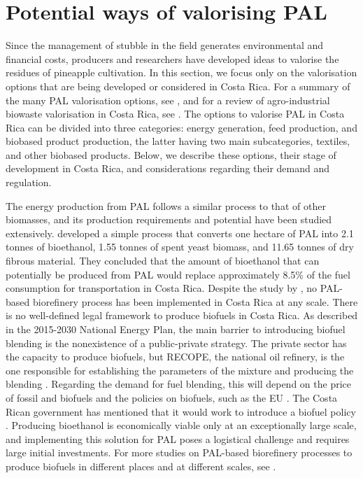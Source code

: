 \section{Potential ways of valorising PAL}
\label{valoriseOptions}

Since the management of stubble in the field generates environmental and financial costs, producers and researchers have developed ideas to valorise the residues of pineapple cultivation. In this section, we focus only on the valorisation options that are being developed or considered in Costa Rica. For a summary of the many PAL valorisation options, see \cite{aili2021recent}, and for a review of agro-industrial biowaste valorisation in Costa Rica, see \cite{eixenberger2022tropical}. The options to valorise PAL in Costa Rica can be divided into three categories: energy generation, feed production, and biobased product production, the latter having two main subcategories, textiles, and other biobased products. Below, we describe these options, their stage of development in Costa Rica, and considerations regarding their demand and regulation. 

The energy production from PAL follows a similar process to that of other biomasses, and its production requirements and potential have been studied extensively. \cite{chen2020production} developed a simple process that converts one hectare of PAL into 2.1 tonnes of bioethanol, 1.55 tonnes of spent yeast biomass, and 11.65 tonnes of dry fibrous material. They concluded that the amount of bioethanol that can potentially be produced from PAL would replace approximately 8.5\% of the fuel consumption for transportation in Costa Rica. Despite the study by \citeauthor{chen2020production}, no PAL-based biorefinery process has been implemented in Costa Rica at any scale. There is no well-defined legal framework to produce biofuels in Costa Rica. As described in the 2015-2030 National Energy Plan, the main barrier to introducing biofuel blending is the nonexistence of a public-private strategy. The private sector has the capacity to produce biofuels, but RECOPE, the national oil refinery, is the one responsible for establishing the parameters of the mixture and producing the blending \citep{planClimaCR}. Regarding the demand for fuel blending, this will depend on the price of fossil and biofuels and the policies on biofuels, such as the EU \citeauthor{Directivebiofuels}. The Costa Rican government has mentioned that it would work to introduce a biofuel policy \citep{ChavesEtanol}. Producing bioethanol is economically viable only at an exceptionally large scale, and implementing this solution for PAL poses a logistical challenge and requires large initial investments. For more studies on PAL-based biorefinery processes to produce biofuels in different places and at different scales, see \cite{murcia2022biorefinery, saini2022valorization, silva2020second, mund2021cellulose}.

